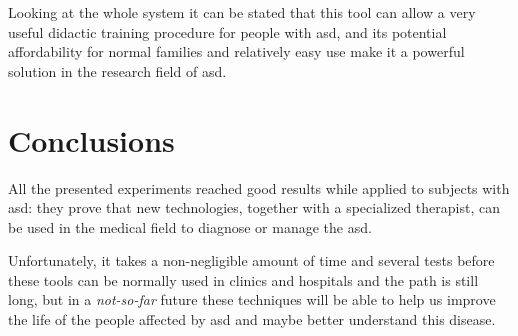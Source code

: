 \documentclass[12pt,journal,draftclsnofoot,onecolumn]{IEEEtran}
\begin{document}
Looking at the whole system it can be stated that this tool can allow a very useful didactic training procedure for people with \gls{asd}, and its potential affordability for normal families and relatively easy use make it a powerful solution in the research field  of \gls{asd}.

\section{Conclusions}\label{sec:conclusions}
All the presented experiments reached good results while applied to subjects with \gls{asd}: they prove that new technologies, together with a specialized therapist, can be used in the medical field to diagnose or manage the \gls{asd}.

Unfortunately, it takes a non-negligible amount of time and several tests before these tools can be normally used in clinics and hospitals and the path is still long, but in a \textit{not-so-far} future these techniques will be able to help us improve the life of the people affected by \gls{asd} and maybe better understand this disease.



\end{document}
